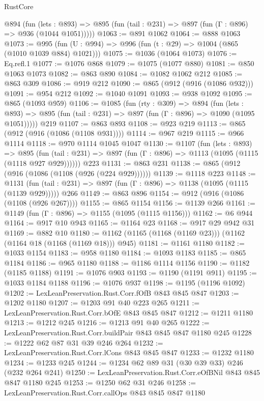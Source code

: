 \begin{lexlean}{RustCore}
\begin{coremodule}
    @894
      (fun (lets : @893) =>
      @895 (fun (tail : @231) => @897 (fun (Γ : @896) => @936 (@1044 @1051)))))
@1063 := @891 @1062
@1064 := @888 @1063
@1073 := @995 (fun (U : @994) => @996 (fun (t : @29) => @1004 (@865 (@1010 @1039 @884) @1021)))
@1075 := @1036 (@1064 @1073)
@1076 := Eq.refl.{1}
@1077 := @1076 @868
@1079 := @1075 (@1077 @880)
@1081 := @850 @1063 @1073
@1082 := @863 @890
@1084 := @1082 @1062 @212
@1085 := @863 @309
@1086 := @919 @212
@1090 := @865 (@912 (@916 (@1086 @932)))
@1091 := @954 @212
@1092 := @1040 @1091
@1093 := @938 @1092
@1095 := @865 (@1093 @959)
@1106 := @1085
    (fun (rty : @309) =>
    @894
      (fun (lets : @893) =>
      @895 (fun (tail : @231) => @897 (fun (Γ : @896) => @1090 (@1095 @1051)))))
    @219
@1107 := @863 @893
@1108 := @923 @219
@1113 := @865 (@912 (@916 (@1086 (@1108 @931))))
@1114 := @967 @219
@1115 := @966 @1114
@1118 := @970 @1114 @1045 @1047
@1130 := @1107
    (fun (lets : @893) =>
    @895 (fun (tail : @231) => @897 (fun (Γ : @896) => @1113 (@1095 (@1115 (@1118 @927 @929))))))
    @223
@1131 := @863 @231
@1138 := @865 (@912 (@916 (@1086 (@1108 (@926 (@224 @929))))))
@1139 := @1118 @223
@1148 := @1131
    (fun (tail : @231) => @897 (fun (Γ : @896) => @1138 (@1095 (@1115 (@1139 @929)))))
    @266
@1149 := @863 @896
@1154 := @912 (@916 (@1086 (@1108 (@926 @267))))
@1155 := @865 @1154
@1156 := @1139 @266
@1161 := @1149 (fun (Γ : @896) => @1155 (@1095 (@1115 @1156)))
@1162 := @6 @944
@1164 := @917 @10 @943
@1165 := @1164 @23
@1168 := @917 @29 @942 @31
@1169 := @882 @10
@1180 := @1162 (@1165 (@1168 (@1169 @23))) (@1162 (@1164 @18 (@1168 (@1169 @18))) @945)
@1181 := @1161 @1180
@1182 := @1033 @1154
@1183 := @958 @1180
@1184 := @1093 @1183
@1185 := @865 @1184
@1186 := @965 @1180
@1188 := @1186 @1114 @1156
@1190 := @1182 (@1185 @1188)
@1191 := @1076 @903
@1193 := @1190 (@1191 @911)
@1195 := @1033 @1184 @1188
@1196 := @1076 @937
@1198 := @1195 (@1196 @1092)
@1202 := LexLeanPreservation.Rust.Corr.fOfB @843 @845 @847
@1203 := @1202 @1180
@1207 := @1203 @91 @40 @223 @265
@1211 := LexLeanPreservation.Rust.Corr.bOfE @843 @845 @847
@1212 := @1211 @1180
@1213 := @1212 @245
@1216 := @1213 @91 @40 @265
@1222 := LexLeanPreservation.Rust.Corr.buildPair @843 @845 @847 @1180 @245
@1228 := @1222 @62 @87 @31 @39 @246 @264
@1232 := LexLeanPreservation.Rust.Corr.lCons @843 @845 @847
@1233 := @1232 @1180
@1234 := @1233 @245
@1244 := @1234 @62 @89 @31 (@30 @39 @33) @246 (@232 @264 @241)
@1250 := LexLeanPreservation.Rust.Corr.eOfBNil @843 @845 @847 @1180 @245
@1253 := @1250 @62 @31 @246
@1258 := LexLeanPreservation.Rust.Corr.callOps @843 @845 @847 @1180

\end{coremodule}
\end{lexlean}
